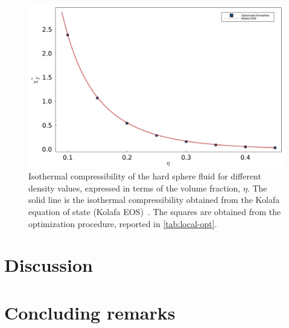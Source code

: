 \begin{figure}
    \centering
    \includegraphics[scale=0.35]{figuras/capitulo-5/chi-eta.pdf}
    \caption{Isothermal compressibility of the hard sphere fluid for different density values, expressed in terms of the volume fraction, \(\eta .\) The solid line is the isothermal compressibility obtained from the Kolafa equation of state (Kolafa EOS)~\cite{kolafaAccurateEquationState2004}. The squares are obtained from the optimization procedure, reported in \autoref{tab:local-opt}.}
\end{figure}

\section{Discussion}

\section{Concluding remarks}